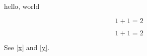 \documentclass{amsart}
\begin{document}
hello, world

\begin{equation}
    1 + 1 = 2 \tag{$x$}\label{x}
\end{equation}

\begin{equation}
    1 + 1 = 2 \tag*{$y$}\label{y}
\end{equation}

See \eqref{x} and \eqref{y}.
\end{document}
